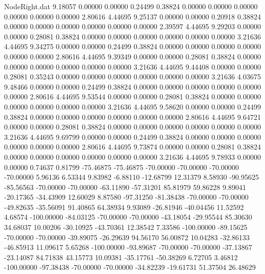 \begin{filecontents}{NodeRight.dat}
   9.18057    0.00000    0.00000     0.24499    0.38824    0.00000    0.00000    0.00000    0.00000    0.00000    0.00000    2.80616    4.44695
   9.25137    0.00000    0.00000     0.20918    0.38824    0.00000    0.00000    0.00000    0.00000    0.00000    0.00000    2.39597    4.44695
   9.29203    0.00000    0.00000     0.28081    0.38824    0.00000    0.00000    0.00000    0.00000    0.00000    0.00000    3.21636    4.44695
   9.34275    0.00000    0.00000     0.24499    0.38824    0.00000    0.00000    0.00000    0.00000    0.00000    0.00000    2.80616    4.44695
   9.39349    0.00000    0.00000     0.28081    0.38824    0.00000    0.00000    0.00000    0.00000    0.00000    0.00000    3.21636    4.44695
   9.44408    0.00000    0.00000     0.28081    0.35243    0.00000    0.00000    0.00000    0.00000    0.00000    0.00000    3.21636    4.03675
   9.48466    0.00000    0.00000     0.24499    0.38824    0.00000    0.00000    0.00000    0.00000    0.00000    0.00000    2.80616    4.44695
   9.53544    0.00000    0.00000     0.28081    0.38824    0.00000    0.00000    0.00000    0.00000    0.00000    0.00000    3.21636    4.44695
   9.58620    0.00000    0.00000     0.24499    0.38824    0.00000    0.00000    0.00000    0.00000    0.00000    0.00000    2.80616    4.44695
   9.64721    0.00000    0.00000     0.28081    0.38824    0.00000    0.00000    0.00000    0.00000    0.00000    0.00000    3.21636    4.44695
   9.69799    0.00000    0.00000     0.24499    0.38824    0.00000    0.00000    0.00000    0.00000    0.00000    0.00000    2.80616    4.44695
   9.73874    0.00000    0.00000     0.28081    0.38824    0.00000    0.00000    0.00000    0.00000    0.00000    0.00000    3.21636    4.44695
   9.78933    0.00000    0.00000     0.74637    0.81799  -75.46875  -75.46875  -70.00000  -70.00000  -70.00000  -70.00000    5.96136    6.53344
   9.83982   -6.88110  -12.68799    12.31379    8.58930  -90.95625  -85.56563  -70.00000  -70.00000  -63.11890  -57.31201   85.81979   59.86228
   9.89041  -20.17365  -34.43909    12.60029    8.87580  -97.31250  -81.38438  -70.00000  -70.00000  -49.82635  -35.56091   91.40865   64.38934
   9.93089  -26.81946  -40.04456    11.52592    4.68574 -100.00000  -84.03125  -70.00000  -70.00000  -43.18054  -29.95544   85.30630   34.68037
  10.00206  -30.10925  -43.70361    12.38542    7.33586 -100.00000  -89.15625  -70.00000  -70.00000  -39.89075  -26.29639   94.56170   56.00872
  10.04283  -32.86133  -46.85913    11.09617    5.65268 -100.00000  -93.89687  -70.00000  -70.00000  -37.13867  -23.14087   84.71838   43.15773
  10.09381  -35.17761  -50.38269     6.72705    3.46812 -100.00000  -97.38438  -70.00000  -70.00000  -34.82239  -19.61731   51.37504   26.48629

\end{filecontents}
